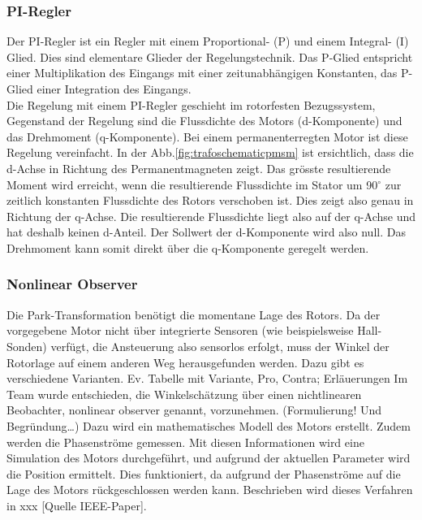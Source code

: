 \subsubsection{PI-Regler}
Der PI-Regler ist ein Regler mit einem Proportional- (P) und einem Integral- (I) Glied. Dies sind elementare Glieder der Regelungstechnik. Das P-Glied entspricht einer Multiplikation des Eingangs mit einer zeitunabhängigen Konstanten, das P-Glied einer Integration des Eingangs. 
\\
Die Regelung mit einem PI-Regler geschieht im rotorfesten Bezugssystem, Gegenstand der Regelung sind die Flussdichte des Motors (d-Komponente) und das Drehmoment (q-Komponente). Bei einem permanenterregten Motor ist diese Regelung vereinfacht. In der Abb.\ref{fig:trafoschematicpmsm} ist ersichtlich, dass die d-Achse in Richtung des Permanentmagneten zeigt. Das grösste resultierende Moment wird erreicht, wenn die resultierende Flussdichte im Stator um 90\(^\circ\) zur zeitlich konstanten Flussdichte des Rotors verschoben ist. Dies zeigt also genau in Richtung der q-Achse. Die resultierende Flussdichte liegt also auf der q-Achse und hat deshalb keinen d-Anteil. Der Sollwert der d-Komponente wird also null. Das Drehmoment kann somit direkt über die q-Komponente geregelt werden. 


\subsubsection{Nonlinear Observer}
Die Park-Transformation benötigt die momentane Lage des Rotors. Da der vorgegebene Motor nicht über integrierte Sensoren (wie beispielsweise Hall-Sonden) verfügt, die Ansteuerung also sensorlos erfolgt, muss der Winkel der Rotorlage auf einem anderen Weg herausgefunden werden. Dazu gibt es verschiedene Varianten. 
Ev. Tabelle mit Variante, Pro, Contra; Erläuerungen 
Im Team wurde entschieden, die Winkelschätzung über einen nichtlinearen Beobachter, nonlinear observer genannt, vorzunehmen. (Formulierung! Und Begründung…) Dazu wird ein mathematisches Modell des Motors erstellt. Zudem werden die Phasenströme gemessen. Mit diesen Informationen wird eine Simulation des Motors durchgeführt, und aufgrund der aktuellen Parameter wird die Position ermittelt. Dies funktioniert, da aufgrund der Phasenströme auf die Lage des Motors rückgeschlossen werden kann. Beschrieben wird dieses Verfahren in xxx [Quelle IEEE-Paper].

